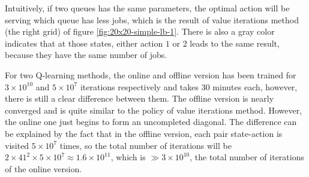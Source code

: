 \documentclass[
  a4paper, xcolor = usenames,dvipsnames]{article}
\begin{document}
Intuitively, if two queues has the same parameters, the optimal action will be serving which queue has less jobs, which is the result of value iterations method (the right grid) of figure \ref{fig:20x20-simple-lb-1}. There is also a gray color indicates that at those states, either action \(1\) or \(2\) leads to the same result, because they have the same number of jobs.

For two Q-learning methods, the online and offline version has been trained for \(3 \times 10^{10}\) and \(5 \times 10^{7}\) iterations respectively and takes 30 minutes each, however, there is still a clear difference between them. The offline version is nearly converged and is quite similar to the policy of value iterations method. However, the online one just begins to form an uncompleted diagonal. The difference can be explained by the fact that in the offline version, each pair state-action is visited \(5 \times 10^{7}\) times, so the total number of iterations will be \(2 \times 41^{2} \times 5 \times 10^{7} \approx 1.6 \times 10^{11}\), which is \(\gg 3 \times 10^{10}\), the total number of iterations of the online version.

\newpage

\printbibliography
\end{document}
